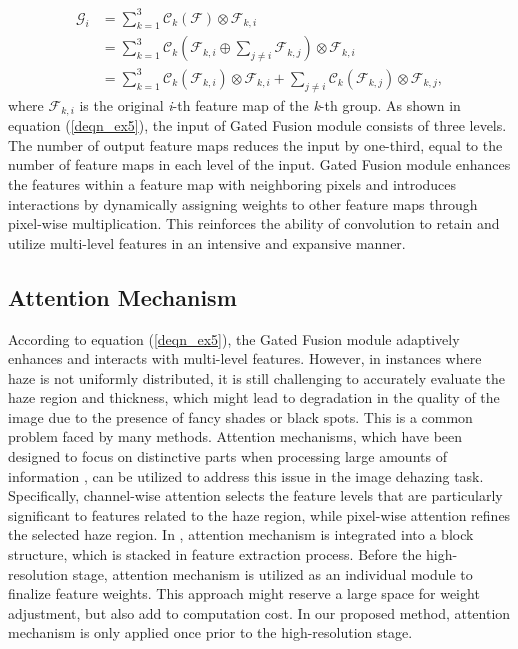 \documentclass[lettersize,journal]{IEEEtran}
\begin{document}
\begin{equation}
    \label{deqn_ex5}
    \begin{aligned}
        \mathcal{G}_i &= \sum_{k=1}^3 \mathcal{C}_k(\mathcal{F}) \otimes \mathcal{F}_{k,i}\\
        &= \sum_{k=1}^3 \mathcal{C}_k(\mathcal{F}_{k,i} \oplus \sum_{j \neq i} \mathcal{F}_{k,j}) \otimes \mathcal{F}_{k,i}\\
        &= \sum_{k=1}^3 \mathcal{C}_k(\mathcal{F}_{k,i}) \otimes \mathcal{F}_{k,i} + \sum_{j \neq i} \mathcal{C}_k(\mathcal{F}_{k,j}) \otimes \mathcal{F}_{k,j},
    \end{aligned}
\end{equation}
where $\mathcal{F}_{k,i}$ is the original \textit{i}-th feature map of the \textit{k}-th group. As shown in equation (\ref{deqn_ex5}), the input of Gated Fusion module consists of three levels. The number of output feature maps reduces the input by one-third, equal to the number of feature maps in each level of the input. Gated Fusion module enhances the features within a feature map with neighboring pixels and introduces interactions by dynamically assigning weights to other feature maps through pixel-wise multiplication. This reinforces the ability of convolution to retain and utilize multi-level features in an intensive and expansive manner.

\subsection{Attention Mechanism}
According to equation (\ref{deqn_ex5}), the Gated Fusion module adaptively enhances and interacts with multi-level features. However, in instances where haze is not uniformly distributed, it is still challenging to accurately evaluate the haze region and thickness, which might lead to degradation in the quality of the image due to the presence of fancy shades or black spots. This is a common problem faced by many methods. Attention mechanisms, which have been designed to focus on distinctive parts when processing large amounts of information \cite{niu2021review_on_attention}, can be utilized to address this issue in the image dehazing task. Specifically, channel-wise attention selects the feature levels that are particularly significant to features related to the haze region, while pixel-wise attention refines the selected haze region. In \cite{qin2020ffa}, attention mechanism \cite{woo2018cbam} is integrated into a block structure, which is stacked in feature extraction process. Before the high-resolution stage, attention mechanism is utilized as an individual module to finalize feature weights. This approach might reserve a large space for weight adjustment, but also add to computation cost. In our proposed method, attention mechanism is only applied once prior to the high-resolution stage. 
\end{document}
